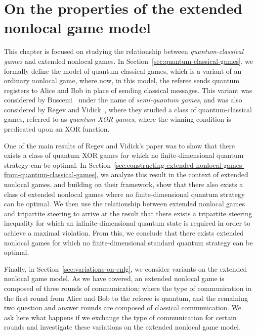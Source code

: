 \chapter{On the properties of the extended nonlocal game model}
\label{chap:infinite_entanglement}

This chapter is focused on studying the relationship between \emph{quantum-classical games} and extended nonlocal games. In Section~\ref{sec:quantum-classical-games}, we formally define the model of quantum-classical games, which is a variant of an ordinary nonlocal game, where now, in this model, the referee sends quantum registers to Alice and Bob in place of sending classical messages. This variant was considered by Buscemi~\cite{Buscemi2012} under the name of \emph{semi-quantum games}, and was also considered by Regev and Vidick~\cite{Regev2013}, where they studied a class of quantum-classical games, referred to as \emph{quantum XOR games}, where the winning condition is predicated upon an XOR function. 

One of the main results of Regev and Vidick's paper was to show that there exists a class of quantum XOR games for which no finite-dimensional quantum strategy can be optimal. In Section~\ref{sec:constructing-extended-nonlocal-games-from-quantum-classical-games}, we analyze this result in the context of extended nonlocal games, and building on their framework, show that there also exists a class of extended nonlocal games where no finite-dimensional quantum strategy can be optimal. We then use the relationship between extended nonlocal games and tripartite steering to arrive at the result that there exists a tripartite steering inequality for which an infinite-dimensional quantum state is required in order to achieve a maximal violation. From this, we conclude that there exists extended nonlocal games for which no finite-dimensional standard quantum strategy can be optimal. 

Finally, in Section~\ref{sec:variations-on-enlg}, we consider variants on the extended nonlocal game model. As we have covered, an extended nonlocal game is composed of three rounds of communication; where the type of communication in the first round from Alice and Bob to the referee is quantum, and the remaining two question and answer rounds are composed of classical communication. We ask here what happens if we exchange the type of communication for certain rounds and investigate these variations on the extended nonlocal game model. 

